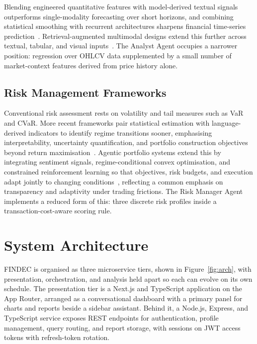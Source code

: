 \documentclass[conference]{IEEEtran}
\begin{document}
Blending engineered quantitative features with model-derived textual signals outperforms single-modality forecasting over short horizons, and combining statistical smoothing with recurrent architectures sharpens financial time-series prediction~\cite{gagneja2026lstm}. Retrieval-augmented multimodal designs extend this further across textual, tabular, and visual inputs~\cite{jiang2025multimodal}. The Analyst Agent occupies a narrower position: regression over OHLCV data supplemented by a small number of market-context features derived from price history alone.

\subsection{Risk Management Frameworks}

Conventional risk assessment rests on volatility and tail measures such as VaR and CVaR. More recent frameworks pair statistical estimation with language-derived indicators to identify regime transitions sooner, emphasising interpretability, uncertainty quantification, and portfolio construction objectives beyond return maximisation~\cite{chen2026smart}. Agentic portfolio systems extend this by integrating sentiment signals, regime-conditional convex optimisation, and constrained reinforcement learning so that objectives, risk budgets, and execution adapt jointly to changing conditions~\cite{mantshimuli2026toward}, reflecting a common emphasis on transparency and adaptivity under trading frictions. The Risk Manager Agent implements a reduced form of this: three discrete risk profiles inside a transaction-cost-aware scoring rule.

\section{System Architecture}
\label{sec:arch}

FINDEC is organised as three microservice tiers, shown in Figure~\ref{fig:arch}, with presentation, orchestration, and analysis held apart so each can evolve on its own schedule. The presentation tier is a Next.js and TypeScript application on the App Router, arranged as a conversational dashboard with a primary panel for charts and reports beside a sidebar assistant. Behind it, a Node.js, Express, and TypeScript service exposes REST endpoints for authentication, profile management, query routing, and report storage, with sessions on JWT access tokens with refresh-token rotation.
\end{document}
